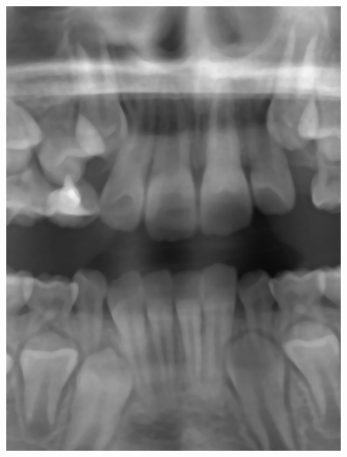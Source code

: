 \documentclass[a4paper,titlepage,12pt]{article}
\begin{document}
\begin{figure}
\begin{minipage}[b]{0.23\linewidth}
		\includegraphics[width=\linewidth]{preprocess/median.png}
	\end{minipage}
	\begin{minipage}[b]{0.23\linewidth}

\end{minipage}
\end{figure}
\end{document}

